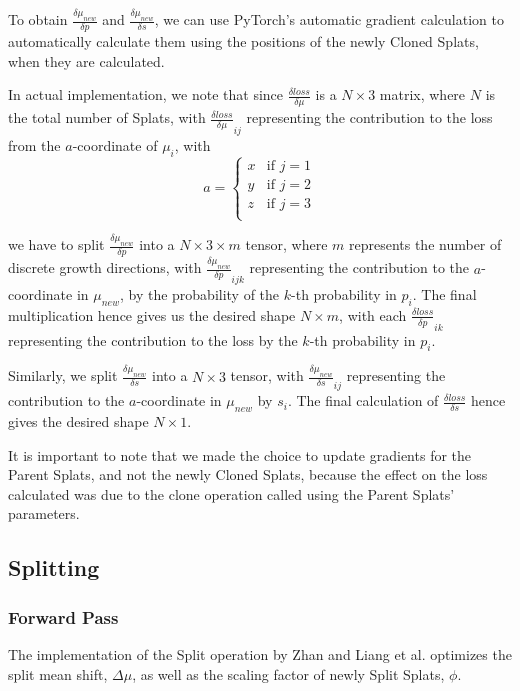 \documentclass[11pt]{report}
\begin{document}
To obtain $\frac{\delta \mu_{new}}{\delta p}$ and $\frac{\delta \mu_{new}}{\delta s}$, we can use PyTorch's automatic gradient calculation to automatically calculate them using the positions of the newly Cloned Splats, when they are calculated.

In actual implementation, we note that since $\frac{\delta loss}{\delta \mu}$ is a $N \times 3$ matrix, where $N$ is the total number of Splats, with $\frac{\delta loss}{\delta \mu}_{ij}$ representing the contribution to the loss from the $a$-coordinate of $\mu_{i}$, with
\[ a = \begin{cases}
x & \textrm{if }j=1\\
y & \textrm{if }j=2\\
z & \textrm{if }j=3\\
\end{cases} \]

we have to split $\frac{\delta \mu_{new}}{\delta p}$ into a $N \times 3 \times m$ tensor, where $m$ represents the number of discrete growth directions, with $\frac{\delta \mu_{new}}{\delta p}_{ijk}$ representing the contribution to the $a$-coordinate in $\mu_{new}$, by the probability of the $k$-th probability in $p_{i}$. The final multiplication hence gives us the desired shape $N \times m$, with each $\frac{\delta loss}{\delta p}_{ik}$ representing the contribution to the loss by the $k$-th probability in $p_{i}$.

Similarly, we split $\frac{\delta \mu_{new}}{\delta s}$ into a $N \times 3$ tensor, with $\frac{\delta \mu_{new}}{\delta s}_{ij}$ representing the contribution to the $a$-coordinate in $\mu_{new}$ by $s_{i}$. The final calculation of $\frac{\delta loss}{\delta s}$ hence gives the desired shape $N \times 1$.

It is important to note that we made the choice to update gradients for the Parent Splats, and not the newly Cloned Splats, because the effect on the loss calculated was due to the clone operation called using the Parent Splats' parameters.

\subsection{Splitting}
\subsubsection{Forward Pass}
The implementation of the Split operation by Zhan and Liang et al. optimizes the split mean shift, $\Delta \mu$, as well as the scaling factor of newly Split Splats, $\phi$.
\end{document}
